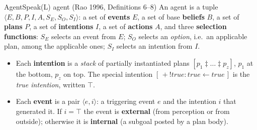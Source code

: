 \begin{nbdef}{AgentSpeak(L) agent (Rao 1996, Definitions 6--8)}
An agent is a tuple $\langle E, B, P, I, A, S_E, S_O, S_I \rangle$: a set of \textbf{events}
$E$, a set of base \textbf{beliefs} $B$, a set of \textbf{plans} $P$, a set of
\textbf{intentions} $I$, a set of \textbf{actions} $A$, and three \textbf{selection
functions}: $S_E$ selects an event from $E$; $S_O$ selects an \emph{option}, i.e.\ an
applicable plan, among the applicable ones; $S_I$ selects an intention from $I$.
\begin{itemize}[nosep]
  \item Each \textbf{intention} is a \emph{stack} of partially instantiated plans
        $[p_1 \ddagger \ldots \ddagger p_z]$, $p_1$ at the bottom, $p_z$ on top. The special
        intention $[\,+!\mathit{true} : \mathit{true} \leftarrow \mathit{true}\,]$ is the
        \emph{true intention}, written $\top$.
  \item Each \textbf{event} is a pair $\langle e, i \rangle$: a triggering event $e$ and the
        intention $i$ that generated it. If $i = \top$ the event is \textbf{external}
        (from perception or from outside); otherwise it is \textbf{internal} (a subgoal
        posted by a plan body).
\end{itemize}
\end{nbdef}

\begin{center}
\end{center}

